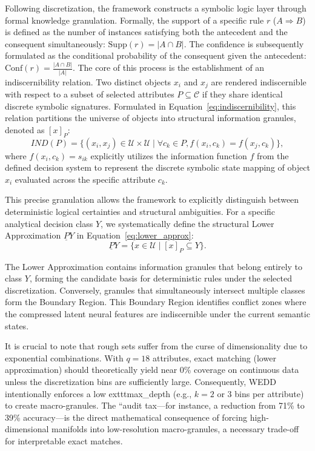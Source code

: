 \documentclass[make,article,submit,pdftex,moreauthors]{Definitions/mdpi}
\newcommand{\U}{\mathcal{U}}
\newcommand{\C}{\mathcal{C}}
\begin{document}
Following discretization, the framework constructs a symbolic logic layer through formal knowledge granulation. Formally, the support of a specific rule $r$ ($A \Rightarrow B$) is defined as the number of instances satisfying both the antecedent and the consequent simultaneously: $\mathrm{Supp}(r) = |A \cap B|$. The confidence is subsequently formulated as the conditional probability of the consequent given the antecedent: $\mathrm{Conf}(r) = \frac{|A \cap B|}{|A|}$. The core of this process is the establishment of an indiscernibility relation. Two distinct objects $x_i$ and $x_j$ are rendered indiscernible with respect to a subset of selected attributes $P \subseteq \C$ if they share identical discrete symbolic signatures. Formulated in Equation~\eqref{eq:indiscernibility}, this relation partitions the universe of objects into structural information granules, denoted as $[x]_P$:
\begin{equation}
 \label{eq:indiscernibility}
 IND(P) = \{(x_i, x_j) \in \U \times \U \mid \forall c_k \in P, f(x_i, c_k) = f(x_j, c_k)\},
\end{equation}
where $f(x_i, c_k) = s_{ik}$ explicitly utilizes the information function $f$ from the defined decision system to represent the discrete symbolic state mapping of object $x_i$ evaluated across the specific attribute $c_k$.

This precise granulation allows the framework to explicitly distinguish between deterministic logical certainties and structural ambiguities. For a specific analytical decision class $Y$, we systematically define the structural Lower Approximation $\underline{P}Y$ in Equation~\eqref{eq:lower_approx}:
\begin{equation}
 \label{eq:lower_approx}
 \underline{P}Y = \{x \in \U \mid [x]_P \subseteq Y\}.
\end{equation}

The Lower Approximation contains information granules that belong entirely to class $Y$, forming the candidate basis for deterministic rules under the selected discretization. Conversely, granules that simultaneously intersect multiple classes form the Boundary Region. This Boundary Region identifies conflict zones where the compressed latent neural features are indiscernible under the current semantic states.

It is crucial to note that rough sets suffer from the curse of dimensionality due to exponential combinations. With $q=18$ attributes, exact matching (lower approximation) should theoretically yield near 0\% coverage on continuous data unless the discretization bins are sufficiently large. Consequently, WEDD intentionally enforces a low 	exttt{max\_depth} (e.g., $k=2$ or $3$ bins per attribute) to create macro-granules. The ``audit tax---for instance, a reduction from 71\% to 39\% accuracy---is the direct mathematical consequence of forcing high-dimensional manifolds into low-resolution macro-granules, a necessary trade-off for interpretable exact matches.
\end{document}
